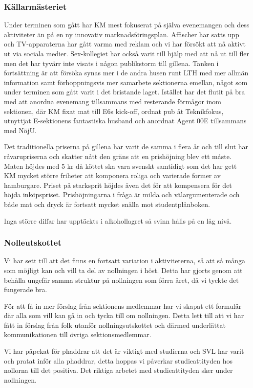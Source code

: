 \documentclass[../_main/handlingar.tex]{subfiles}
\begin{document}
\subsubsection*{Källarmästeriet}
Under terminen som gått har KM mest fokuserat på själva evenemangen och dess aktiviteter än på en ny innovativ marknadsföringsplan. Affischer har satts upp och TV-apparaterna har gått varma med reklam och vi har försökt att nå aktivt ut via sociala medier. Sex-kollegiet har också varit till hjälp med att nå ut till fler men det har tyvärr inte visats i någon publikstorm till gillena. Tanken i fortsättning är att försöka synas mer i de andra husen runt LTH med mer allmän information samt förhoppningsvis mer samarbete sektionerna emellan, något som under terminen som gått varit i det bristande laget. Istället har det flutit på bra med att anordna evenemang tillsammans med resterande förmågor inom sektionen, där KM fixat mat till E6s kick-off, ordnat pub åt Teknikfokus, utnyttjat E-sektionens fantastiska husband och anordnat Agent 00E tillsammans med NöjU.

Det traditionella priserna på gillena har varit de samma i flera år och till slut har råvarupriserna och skatter nått den gräns att en prishöjning blev ett måste. Maten höjdes med 5 kr då köttet ska vara svenskt samtidigt som det har gett KM mycket större friheter att komponera roliga och varierade former av hamburgare. Priset på starksprit höjdes även det för att kompensera för det höjda inköpspriset. Prishöjningarna i fråga är milda och välargumenterade och både mat och dryck är fortsatt mycket snälla mot studentplånboken.

Inga större diffar har upptäckts i alkohollagret så svinn hålls på en låg nivå.
\newpage
\subsubsection*{Nolleutskottet}
Vi har sett till att det finns en fortsatt variation i aktiviteterna, så att så många som möjligt kan och vill ta del av nollningen i höst. Detta har gjorts genom att behålla ungefär samma struktur på nollningen som förra året, då vi tyckte det fungerade bra.

För att få in mer förslag från sektionens medlemmar har vi skapat ett formulär där alla som vill kan gå in och tycka till om nollningen. Detta lett till att vi har fått in förslag från folk utanför nollningsutskottet och därmed underlättat kommunikationen till övriga sektionsmedlemmar.

Vi har påpekat för phaddrar att det är viktigt med studierna och SVL har varit och pratat inför alla phaddrar, detta hoppas vi påverkar studieattityden hos nollorna till det positiva. Det riktiga arbetet med studieattityden sker under nollningen.
\end{document}
